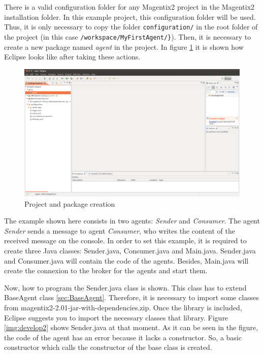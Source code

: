There is a valid configuration folder for any Magentix2 project in the Magentix2 installation folder. In this example project, this configuration folder will be used. Thus, it is only necessary to copy the folder \verb|configuration/| in the root folder of the project (in this case \verb|/workspace/MyFirstAgent/}|). Then, it is necessary to create a new package named \textit{agent} in the project. In figure \ref{img:develop1} it is shown how Eclipse looks like after taking these actions.
\begin{figure}[!h]
\centering
\includegraphics[scale=0.25]{Quickstart/images/develop1}
\caption{Project and package creation}
\label{img:develop1}
\end{figure}

The example shown here consists in two agents: \textit{Sender} and \textit{Consumer}. The agent \textit{Sender}  sends a message to agent \textit{Consumer}, who  writes the content of the received message on the console. In order to set this example, it is required to create three Java classes: Sender.java, Consumer.java and Main.java. Sender.java and Consumer.java will contain the code of the agents. Besides, Main.java will create the connexion to the broker for the agents and start them.

Now, how to program the Sender.java class is shown. This class has to extend BaseAgent class \ref{sec:BaseAgent}. Therefore, it is necessary  to import some classes from magentix2-2.01-jar-with-dependencies.zip. Once the library is included, Eclipse suggests you to import the necessary classes that library. Figure \ref{img:develop2} shows Sender.java at that moment. As it can be seen in the figure, the code of the agent has an error because it lacks a constructor. So, a basic constructor which calls the constructor of the base class is created.


